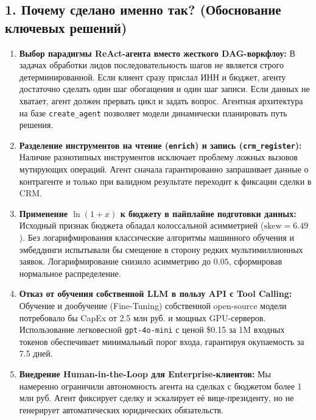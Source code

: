 \documentclass[12pt,a4paper]{article}
\begin{document}
	\subsection*{1. Почему сделано именно так? (Обоснование ключевых решений)}
	\begin{enumerate}[leftmargin=*,topsep=2pt]
		\item \textbf{Выбор парадигмы ReAct-агента вместо жесткого DAG-воркфлоу:} В задачах обработки лидов последовательность шагов не является строго детерминированной. Если клиент сразу прислал ИНН и бюджет, агенту достаточно сделать один шаг обогащения и один шаг записи. Если данных не хватает, агент должен прервать цикл и задать вопрос. Агентная архитектура на базе \texttt{create\_agent} позволяет модели динамически планировать путь решения.
		\item \textbf{Разделение инструментов на чтение (\texttt{enrich}) и запись (\texttt{crm\_register}):} Наличие разнотипных инструментов исключает проблему ложных вызовов мутирующих операций. Агент сначала гарантированно запрашивает данные о контрагенте и только при валидном результате переходит к фиксации сделки в CRM.
		\item \textbf{Применение $\ln(1+x)$ к бюджету в пайплайне подготовки данных:} Исходный признак бюджета обладал колоссальной асимметрией ($\text{skew} = 6.49$). Без логарифмирования классические алгоритмы машинного обучения и эмбеддинги испытывали бы смещение в сторону редких мультимиллионных заявок. Логарифмирование снизило асимметрию до $0.05$, сформировав нормальное распределение.
		\item \textbf{Отказ от обучения собственной LLM в пользу API с Tool Calling:} Обучение и дообучение (Fine-Tuning) собственной open-source модели потребовало бы CapEx от 2.5 млн руб. и мощных GPU-серверов. Использование легковесной \texttt{gpt-4o-mini} с ценой \$0.15 за 1M входных токенов обеспечивает минимальный порог входа, гарантируя окупаемость за 7.5 дней.
		\item \textbf{Внедрение Human-in-the-Loop для Enterprise-клиентов:} Мы намеренно ограничили автономность агента на сделках с бюджетом более 1 млн руб. Агент фиксирует сделку и эскалирует её вице-президенту, но не генерирует автоматических юридических обязательств.
	\end{enumerate}
\end{document}
